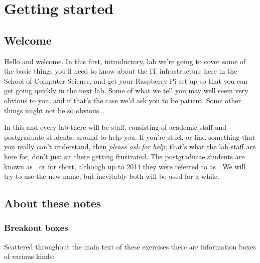 
\chapter{Getting started}
\label{cha:getting-started}

\minitoc
{}

\section{Welcome}


Hello and welcome. In this first, introductory, lab we're going to
cover some of the basic things you'll need to know about the IT
infrastructure here in the School of Computer Science, and get your Raspberry Pi set up so that you can get going quickly in the next lab.
Some of what we
tell you may well seem very obvious to you, and if that's the case
we'd ask you to be patient. Some other things might not be so obvious...

In this and every lab there will be staff, consisting of academic staff and postgraduate students, around to help you. If you're stuck or find something that you really can't understand, then \emph{please ask for help}; that's what the lab staff are here for, don't just sit there getting frustrated. The postgraduate students are known as , or  for short, although up to 2014 they were referred to as . We will try to use the new name, but inevitably both will be used for a while. 


\section{About these notes}
\subsection{Breakout boxes}

Scattered throughout the main text of these exercises there are information boxes of various kinds:
\\

